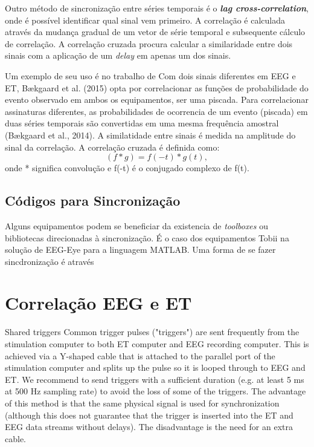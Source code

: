 Outro método de sincronização entre séries temporais é o \textit{\textbf{lag cross-correlation}}, onde é possível identificar
qual sinal vem primeiro. A correlação é calculada através da mudança gradual de um vetor de série temporal e subsequente cálculo 
de correlação. A correlação cruzada procura calcular a similaridade entre dois sinais com a aplicação de um \textit{delay} em apenas um dos sinais.

Um exemplo de seu uso é no trabalho de Com dois sinais diferentes em EEG e ET, Bækgaard et al. (2015) opta por correlacionar as funções de probabilidade do evento observado em 
ambos os equipamentos, ser uma piscada. 
Para correlacionar assinaturas diferentes, as probabilidades de ocorrencia de um evento (piscada) em duas séries temporais são convertidas em uma mesma frequência amostral (Bækgaard et al., 2014).
A similatidade entre sinais é medida na amplitude do sinal da correlação. A correlação cruzada é definida como:
\begin{equation}\label{eq:correlação cruzada}
    (f * g) = f(-t)*g(t), 
    \end{equation}
onde * significa convolução e f(-t) é o conjugado complexo de f(t).






\subsection{Códigos para Sincronização}
Alguns equipamentos podem se beneficiar da existencia de \textit{toolboxes} ou bibliotecas direcionadas à sincronização. É o caso 
dos equipamentos Tobii na solução de EEG-Eye para a linguagem MATLAB. Uma forma de se fazer sincdronização é através 

\section{Correlação EEG e ET}

 Shared triggers
Common trigger pulses ("triggers") are sent frequently from the 
stimulation computer to both ET computer and EEG recording computer. 
This is achieved via a Y-shaped cable that is attached to the parallel 
port of the stimulation computer and splits up the pulse so it is looped through 
to EEG and ET. We recommend to send triggers with a sufficient duration 
(e.g. at least 5 ms at 500 Hz sampling rate) to avoid the loss of some of the triggers.
 The advantage of this method is that the same physical signal is used for 
 synchronization (although this does not guarantee that the trigger is
  inserted into the ET and EEG data streams without delays). The disadvantage
   is the need for an extra cable.

